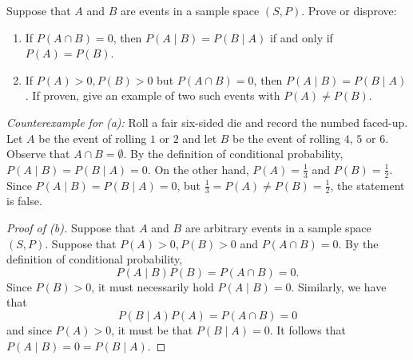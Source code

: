 \documentclass{article}
\theoremstyle{definition}
\begin{document}
\begin{question}
    Suppose that $A$ and $B$ are events in a sample space $(S,P)$.
    Prove or disprove:
    \begin{enumerate}
        \item If $P(A \cap B)=0$, then $P(A\mid B)=P(B\mid A)$ if and only
            if $P(A)=P(B)$.
        \item If $P(A)>0, P(B)>0$ but $P(A \cap B)=0$, then $P(A\mid
            B)=P(B\mid A)$.  If proven, give an example of two such events
            with $P(A) \ne P(B)$.
    \end{enumerate}
\end{question}
\begin{solution}
 \textit{Counterexample for (a):}
    Roll a fair six-sided die and record the numbed faced-up. Let $A$ be the
    event of rolling $1$ or $2$ and let $B$ be the event of rolling $4$, $5$
    or $6$.  Observe that $A \cap B = \emptyset$. By the definition of
    conditional probability, $P(A \mid B) = P(B \mid A) = 0$. On the other
    hand, $P(A) = \frac{1}{3}$ and $P(B) = \frac{1}{2}$. Since $P(A \mid B)
    = P(B \mid A) = 0$, but $\frac{1}{3} = P(A) \ne P(B) = \frac{1}{2}$, the
    statement is false.
    
\begin{proof}[Proof of (b)]
    Suppose that $A$ and $B$ are arbitrary events in a sample space $(S,P)$.
    Suppose that $P(A)>0, P(B)>0$ and $P(A \cap B)=0$.  By the definition of
    conditional probability,
    \[
        P(A \mid B)P(B) = P(A \cap B) = 0.
    \]
    Since $P(B) >0$, it must necessarily hold $P(A\mid B) = 0$.  Similarly,
    we have that
    \[
        P(B\mid A)P(A) = P(A \cap B) = 0
    \]
    and since $P(A) >0$, it must be that $P(B\mid A) = 0$. It follows that
    $P(A \mid B) = 0 = P(B \mid A)$.
\end{proof}
\end{solution}
\end{document}
